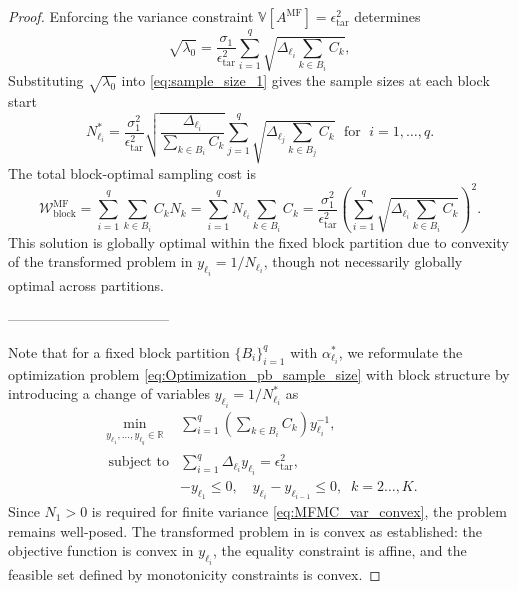 \begin{proof}
%
Enforcing the variance constraint $\mathbb{V}[A^{\text{MF}}] = \epsilon_{\text{tar}}^2$ determines 
%
\[
\sqrt{\lambda_0}=\frac{\sigma_1}{\epsilon_{\text{tar}}^2} \sum_{i=1}^{q} \sqrt{\Delta_{\ell_i}\sum_{k\in B_i} C_{k}},
\]
%
Substituting $\sqrt{\lambda_0}$ into \eqref{eq:sample_size_1} gives the sample sizes at each block start
%
\[
N_{\ell_i}^* = \frac{\sigma_1^2}{\epsilon_{\text{tar}}^2}\sqrt{\frac{\Delta_{\ell_i}}{\sum_{k\in B_i} C_{k}}}  \sum_{j=1}^{q} \sqrt{\Delta_{\ell_j}\sum_{k\in B_j} C_{k}} \;\text{ for }\; i=1,\ldots,q.
\]
%
The total block-optimal sampling cost is
%
\begin{equation*}
\mathcal{W}_{\text{block}}^{\text{MF}} = \sum_{i=1}^q \sum_{k\in B_i} C_k N_k = \sum_{i=1}^q N_{\ell_i}\sum_{k\in B_i} C_k =\frac{\sigma_1^2}{\epsilon_{\text{tar}}^2}\left(\sum_{i=1}^{q} \sqrt{\Delta_{\ell_i}\sum_{k\in B_i} C_{k}}\right)^2.
\end{equation*}
%
This solution is globally optimal within the fixed block partition due to convexity of the transformed problem in $y_{\ell_i} = 1/N_{\ell_i}$, though not necessarily globally optimal across partitions.

-----------------------------------

Note that for a fixed block partition $\{B_i\}_{i=1}^q$ with $\alpha_{\ell_i}^*$, we reformulate the optimization problem \eqref{eq:Optimization_pb_sample_size} with block structure by introducing a change of variables $y_{\ell_i} = 1/N_{\ell_i}^*$ as
%
\begin{equation}\label{eq:Optimization_pb_sample_size3}
    \begin{array}{ll}
    \min \limits_{\begin{array}{c}\scriptstyle y_{\ell_1},\ldots, y_{\ell_q}\in \mathbb{R}
\end{array}} &\displaystyle \sum_{i=1}^q \left(\sum_{k\in B_i}C_{k}\right)y_{\ell_i}^{-1},\\
       \;\,\text{subject to} &\displaystyle \sum_{i=1}^q \Delta_{\ell_i} y_{\ell_i}= \epsilon_{\text{tar}}^2,\\[2pt]
       &\displaystyle -y_{\ell_1}\le 0,\quad \displaystyle y_{\ell_i}-y_{\ell_{i-1}}\le 0, \;\; k=2\ldots,K.
    \end{array}
\end{equation}
%
Since $N_1 > 0$ is required for finite variance \eqref{eq:MFMC_var_convex}, the problem remains well-posed.  The transformed problem in is convex as established: the objective function is convex in $y_{\ell_i}$, the equality constraint is affine, and the feasible set defined by monotonicity constraints is convex.  


\end{proof}
